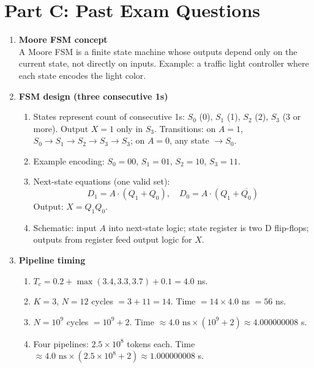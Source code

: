 \documentclass[11pt]{article}
\begin{document}
\section*{Part C: Past Exam Questions}
\begin{enumerate}[label=\textbf{C\arabic*.}]
  \item \textbf{Moore FSM concept}\\
  A Moore FSM is a finite state machine whose outputs depend only on the current state, not directly on inputs. Example: a traffic light controller where each state encodes the light color.

  \item \textbf{FSM design (three consecutive 1s)}\\
  \begin{enumerate}[label=(\alph*)]
    \item States represent count of consecutive 1s: $S_0$ (0), $S_1$ (1), $S_2$ (2), $S_3$ (3 or more). Output $X=1$ only in $S_3$.
    Transitions: on $A=1$, $S_0\to S_1\to S_2\to S_3\to S_3$; on $A=0$, any state $\to S_0$.
    \item Example encoding: $S_0=00$, $S_1=01$, $S_2=10$, $S_3=11$.
    \item Next-state equations (one valid set):
    \[
    D_1 = A \cdot (Q_1 + Q_0),\quad D_0 = A \cdot (Q_1 + \overline{Q_0})
    \]
    Output: $X=Q_1 Q_0$.
    \item Schematic: input $A$ into next-state logic; state register is two D flip-flops; outputs from register feed output logic for $X$.
  \end{enumerate}

  \item \textbf{Pipeline timing}\\
  \begin{enumerate}[label=(\alph*)]
    \item $T_c = 0.2 + \max(3.4,3.3,3.7) + 0.1 = 4.0$ ns.
    \item $K=3$, $N=12$ cycles $= 3 + 11 = 14$. Time $= 14 \times 4.0$ ns $= 56$ ns.
    \item $N=10^9$ cycles $= 10^9 + 2$. Time $\approx 4.0\text{ ns} \times (10^9+2) \approx 4.000000008$ s.
    \item Four pipelines: $2.5\times 10^8$ tokens each. Time $\approx 4.0\text{ ns} \times (2.5\times 10^8 + 2) \approx 1.000000008$ s.
  \end{enumerate}
\end{enumerate}
\end{document}
